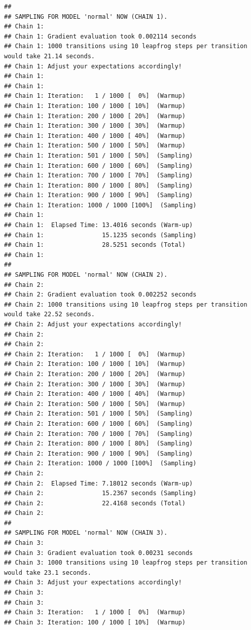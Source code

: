 \documentclass[]{article}
\begin{document}
\begin{verbatim}
## 
## SAMPLING FOR MODEL 'normal' NOW (CHAIN 1).
## Chain 1: 
## Chain 1: Gradient evaluation took 0.002114 seconds
## Chain 1: 1000 transitions using 10 leapfrog steps per transition would take 21.14 seconds.
## Chain 1: Adjust your expectations accordingly!
## Chain 1: 
## Chain 1: 
## Chain 1: Iteration:   1 / 1000 [  0%]  (Warmup)
## Chain 1: Iteration: 100 / 1000 [ 10%]  (Warmup)
## Chain 1: Iteration: 200 / 1000 [ 20%]  (Warmup)
## Chain 1: Iteration: 300 / 1000 [ 30%]  (Warmup)
## Chain 1: Iteration: 400 / 1000 [ 40%]  (Warmup)
## Chain 1: Iteration: 500 / 1000 [ 50%]  (Warmup)
## Chain 1: Iteration: 501 / 1000 [ 50%]  (Sampling)
## Chain 1: Iteration: 600 / 1000 [ 60%]  (Sampling)
## Chain 1: Iteration: 700 / 1000 [ 70%]  (Sampling)
## Chain 1: Iteration: 800 / 1000 [ 80%]  (Sampling)
## Chain 1: Iteration: 900 / 1000 [ 90%]  (Sampling)
## Chain 1: Iteration: 1000 / 1000 [100%]  (Sampling)
## Chain 1: 
## Chain 1:  Elapsed Time: 13.4016 seconds (Warm-up)
## Chain 1:                15.1235 seconds (Sampling)
## Chain 1:                28.5251 seconds (Total)
## Chain 1: 
## 
## SAMPLING FOR MODEL 'normal' NOW (CHAIN 2).
## Chain 2: 
## Chain 2: Gradient evaluation took 0.002252 seconds
## Chain 2: 1000 transitions using 10 leapfrog steps per transition would take 22.52 seconds.
## Chain 2: Adjust your expectations accordingly!
## Chain 2: 
## Chain 2: 
## Chain 2: Iteration:   1 / 1000 [  0%]  (Warmup)
## Chain 2: Iteration: 100 / 1000 [ 10%]  (Warmup)
## Chain 2: Iteration: 200 / 1000 [ 20%]  (Warmup)
## Chain 2: Iteration: 300 / 1000 [ 30%]  (Warmup)
## Chain 2: Iteration: 400 / 1000 [ 40%]  (Warmup)
## Chain 2: Iteration: 500 / 1000 [ 50%]  (Warmup)
## Chain 2: Iteration: 501 / 1000 [ 50%]  (Sampling)
## Chain 2: Iteration: 600 / 1000 [ 60%]  (Sampling)
## Chain 2: Iteration: 700 / 1000 [ 70%]  (Sampling)
## Chain 2: Iteration: 800 / 1000 [ 80%]  (Sampling)
## Chain 2: Iteration: 900 / 1000 [ 90%]  (Sampling)
## Chain 2: Iteration: 1000 / 1000 [100%]  (Sampling)
## Chain 2: 
## Chain 2:  Elapsed Time: 7.18012 seconds (Warm-up)
## Chain 2:                15.2367 seconds (Sampling)
## Chain 2:                22.4168 seconds (Total)
## Chain 2: 
## 
## SAMPLING FOR MODEL 'normal' NOW (CHAIN 3).
## Chain 3: 
## Chain 3: Gradient evaluation took 0.00231 seconds
## Chain 3: 1000 transitions using 10 leapfrog steps per transition would take 23.1 seconds.
## Chain 3: Adjust your expectations accordingly!
## Chain 3: 
## Chain 3: 
## Chain 3: Iteration:   1 / 1000 [  0%]  (Warmup)
## Chain 3: Iteration: 100 / 1000 [ 10%]  (Warmup)

\end{verbatim}
\end{document}
